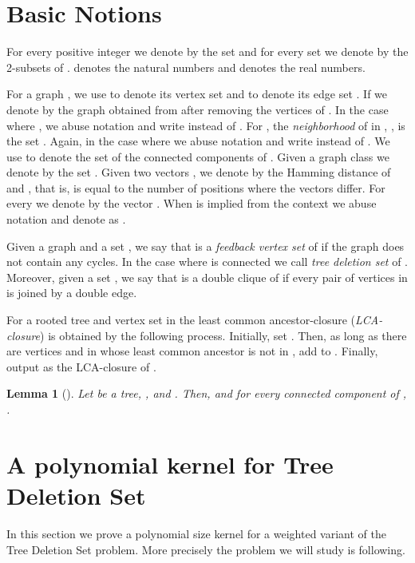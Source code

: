 \documentclass[a4paper,11pt]{article}
\newtheorem{lemma}{Lemma}
\begin{document}
\section{Basic Notions}

For every positive integer  we denote by  the set  and for every set  we denote by  the 2-subsets of .  denotes the natural numbers and  denotes the real numbers.

For a  {graph} , we use   to denote its vertex set  and  to denote its edge set .
If  we denote by  the graph obtained from  after removing the vertices of . 
In the case where , we abuse notation and write  instead of .  
For , the {\em neighborhood} of  in , , is the set .
Again, in the case where  we abuse notation and write  instead of .
We use   to denote the set of the connected components of .
Given a graph class  we denote by  the set .
Given two vectors , we denote by  the Hamming distance of  and , that is,  is equal to 
the number of positions where the vectors differ. For every  we denote by  the vector . 
When  is implied from the context we abuse notation and denote  as .

Given a graph  and a set , we say that  is a {\em feedback vertex set} of  if the graph  does not contain any cycles. In the case
where  is connected we call  {\em tree deletion set} of .
Moreover, given a set , we say that  is a double clique of  if every pair of vertices in  is joined by a double edge.

For a rooted tree  and vertex set  in  the least common ancestor-closure ({\em LCA-closure})  is obtained by the following process.
Initially, set . Then, as long as there are vertices  and  in  whose least common ancestor  is not in , add  to . Finally, output
 as the LCA-closure of .

\begin{lemma}[\cite{FominLMS12}]\label{caclsbnd}
Let  be a tree, , and . Then,  and for every connected component  of , .
\end{lemma}


\section{A polynomial kernel for {\sc Tree Deletion Set}}
In this section we prove a polynomial size kernel for a weighted variant of the  {\sc Tree Deletion Set} problem. More precisely the problem we will study is following. 
\end{document}

